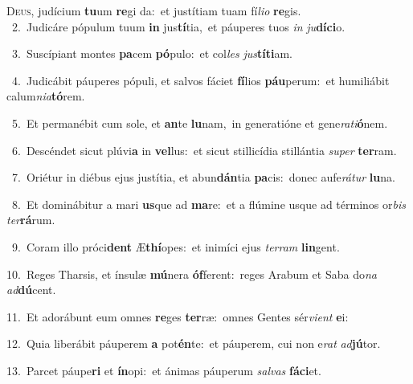 \lettrine{\initial\textcolor{\initialcolor}{D}}{eus,} judícium \textbf{tu}\-um \textbf{re}\-gi da:~\star et justítiam tuam fí\-\textit{li}\-\textit{o} \textbf{re}\-gis.\\
{\numbfont\textcolor{\numbcolor}{~2.}}~Judicáre pópulum tuum \textbf{in} jus\-\textbf{tí}\-tia,~\star et páuperes tuos \textit{in} \textit{ju}\-\textbf{dí}\textbf{ci}o.\par
{\numbfont\textcolor{\numbcolor}{~3.}}~Suscípiant montes \textbf{pa}\-cem \textbf{pó}\-pulo:~\star et col\textit{les} \textit{jus}\-\textbf{tí}\textbf{ti}am.\par
{\numbfont\textcolor{\numbcolor}{~4.}}~Judicábit páuperes pópuli, et salvos fáciet \textbf{fí}\-lios \textbf{páu}\-perum:~\star et humiliábit calum\-\textit{ni}\-\textit{a}\textbf{tó}rem.\par
{\numbfont\textcolor{\numbcolor}{~5.}}~Et permanébit cum sole, et \textbf{an}\-te \textbf{lu}\-nam,~\star in generatióne et gene\-\textit{ra}\-\textit{ti}\textbf{ó}nem.\par
{\numbfont\textcolor{\numbcolor}{~6.}}~Descéndet sicut plúvi\textbf{a} in \textbf{vel}\-lus:~\star et sicut stillicídia stillántia \textit{su}\-\textit{per} \textbf{ter}\-ram.\par
{\numbfont\textcolor{\numbcolor}{~7.}}~Oriétur in diébus ejus justítia, et abun\-\textbf{dán}\-tia \textbf{pa}\-cis:~\star donec aufe\-\textit{rá}\-\textit{tur} \textbf{lu}\-na.\par
{\numbfont\textcolor{\numbcolor}{~8.}}~Et dominábitur a mari \textbf{us}\-que ad \textbf{ma}\-re:~\star et a flúmine usque ad términos or\textit{bis} \textit{ter}\-\textbf{rá}rum.\par
{\numbfont\textcolor{\numbcolor}{~9.}}~Coram illo próci\textbf{dent} Æ\-\textbf{thí}\-opes:~\star et inimíci ejus \textit{ter}\-\textit{ram} \textbf{lin}\-gent.\par
{\numbfont\textcolor{\numbcolor}{10.}}~Reges Tharsis, et ínsulæ \textbf{mú}\-nera \textbf{óf}\-ferent:~\star reges Arabum et Saba do\textit{na} \textit{ad}\-\textbf{dú}cent.\par
{\numbfont\textcolor{\numbcolor}{11.}}~Et adorábunt eum omnes \textbf{re}\-ges \textbf{ter}\-ræ:~\star omnes Gentes sér\-\textit{vi}\-\textit{ent} \textbf{e}\-i:\par
{\numbfont\textcolor{\numbcolor}{12.}}~Quia liberábit páuperem \textbf{a} pot\-\textbf{én}\-te:~\star et páuperem, cui non e\textit{rat} \textit{ad}\-\textbf{jú}tor.\par
{\numbfont\textcolor{\numbcolor}{13.}}~Parcet páupe\textbf{ri} et \textbf{ín}\-opi:~\star et ánimas páuperum \textit{sal}\-\textit{vas} \textbf{fá}\-\textbf{ci}et.\par
